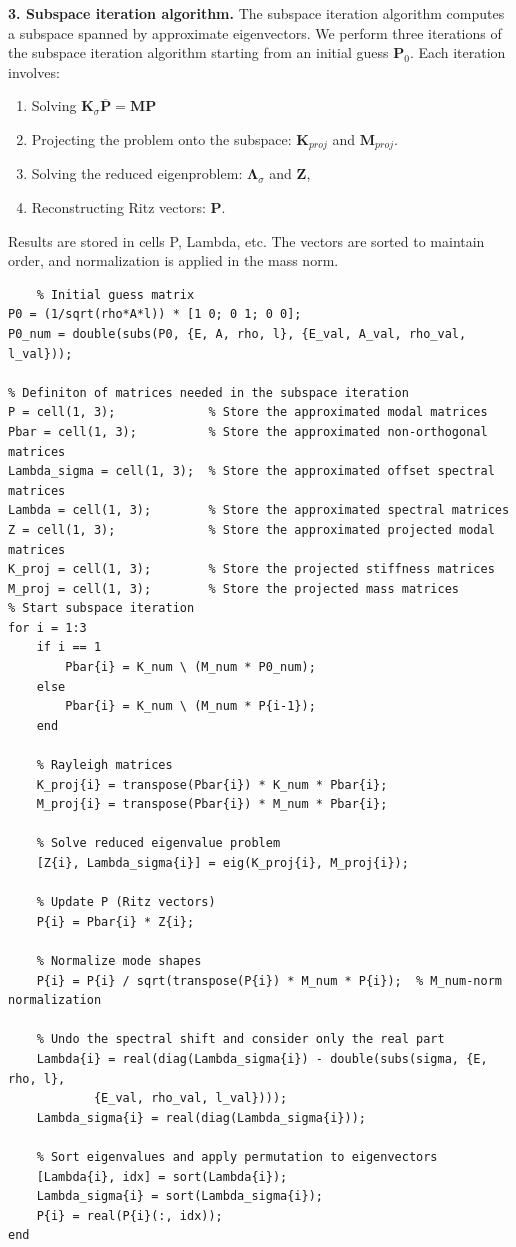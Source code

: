 \documentclass[12pt]{article}
\begin{document}
\textbf{3. Subspace iteration algorithm.}
The subspace iteration algorithm computes a subspace spanned by approximate eigenvectors. We perform three iterations of the subspace iteration algorithm starting from an initial guess $\mathbf P_0$. Each iteration involves:
\begin{enumerate}
   \item Solving $\mathbf{K}_\sigma\overline {\mathbf{P} }= \mathbf{M} \mathbf{P}$
   \item Projecting the problem onto the subspace: $\mathbf{K}_{proj}$ and $\mathbf{M}_{proj}$.
   \item Solving the reduced eigenproblem: $\mathbf \Lambda_{\sigma}$ and $\mathbf{Z}$,
   \item Reconstructing Ritz vectors: $\mathbf P$.
\end{enumerate}
Results are stored in cells P, Lambda, etc. The vectors are sorted to maintain order, and normalization is applied in the mass norm.
\begin{verbatim}   
    % Initial guess matrix
P0 = (1/sqrt(rho*A*l)) * [1 0; 0 1; 0 0];
P0_num = double(subs(P0, {E, A, rho, l}, {E_val, A_val, rho_val, l_val}));

% Definiton of matrices needed in the subspace iteration 
P = cell(1, 3);             % Store the approximated modal matrices
Pbar = cell(1, 3);          % Store the approximated non-orthogonal matrices
Lambda_sigma = cell(1, 3);  % Store the approximated offset spectral matrices
Lambda = cell(1, 3);        % Store the approximated spectral matrices
Z = cell(1, 3);             % Store the approximated projected modal matrices
K_proj = cell(1, 3);        % Store the projected stiffness matrices
M_proj = cell(1, 3);        % Store the projected mass matrices
% Start subspace iteration
for i = 1:3
    if i == 1
        Pbar{i} = K_num \ (M_num * P0_num);     
    else 
        Pbar{i} = K_num \ (M_num * P{i-1});
    end
   
    % Rayleigh matrices
    K_proj{i} = transpose(Pbar{i}) * K_num * Pbar{i};
    M_proj{i} = transpose(Pbar{i}) * M_num * Pbar{i};

    % Solve reduced eigenvalue problem
    [Z{i}, Lambda_sigma{i}] = eig(K_proj{i}, M_proj{i});
   
    % Update P (Ritz vectors)
    P{i} = Pbar{i} * Z{i};

    % Normalize mode shapes
    P{i} = P{i} / sqrt(transpose(P{i}) * M_num * P{i});  % M_num-norm normalization

    % Undo the spectral shift and consider only the real part
    Lambda{i} = real(diag(Lambda_sigma{i}) - double(subs(sigma, {E, rho, l}, 
            {E_val, rho_val, l_val})));
    Lambda_sigma{i} = real(diag(Lambda_sigma{i}));
    
    % Sort eigenvalues and apply permutation to eigenvectors
    [Lambda{i}, idx] = sort(Lambda{i});
    Lambda_sigma{i} = sort(Lambda_sigma{i});
    P{i} = real(P{i}(:, idx));
end
\end{verbatim}
\end{document}
